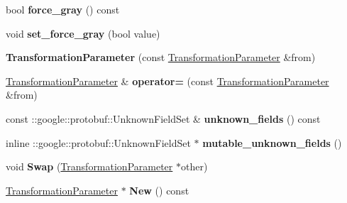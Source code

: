 \begin{DoxyCompactItemize}
bool {\bfseries force\+\_\+gray} () const
\item 
\mbox{\label{classcaffe_1_1_transformation_parameter_a0240305cce1719468726b07a75e9d7bf}} 
void {\bfseries set\+\_\+force\+\_\+gray} (bool value)
\item 
\mbox{\label{classcaffe_1_1_transformation_parameter_a5f3bf7e21a0b138909e8f79fe14c9079}} 
{\bfseries Transformation\+Parameter} (const \mbox{\hyperlink{classcaffe_1_1_transformation_parameter}{Transformation\+Parameter}} \&from)
\item 
\mbox{\label{classcaffe_1_1_transformation_parameter_a898cd4bab74b0477991a00400746e32a}} 
\mbox{\hyperlink{classcaffe_1_1_transformation_parameter}{Transformation\+Parameter}} \& {\bfseries operator=} (const \mbox{\hyperlink{classcaffe_1_1_transformation_parameter}{Transformation\+Parameter}} \&from)
\item 
\mbox{\label{classcaffe_1_1_transformation_parameter_a0df649b76fbb6b25dacf89625b18af6d}} 
const \+::google\+::protobuf\+::\+Unknown\+Field\+Set \& {\bfseries unknown\+\_\+fields} () const
\item 
\mbox{\label{classcaffe_1_1_transformation_parameter_a34152f0da6ea78505db2d8727bcf1677}} 
inline \+::google\+::protobuf\+::\+Unknown\+Field\+Set $\ast$ {\bfseries mutable\+\_\+unknown\+\_\+fields} ()
\item 
\mbox{\label{classcaffe_1_1_transformation_parameter_a45d63004ea061b326e8d1576f086ec4e}} 
void {\bfseries Swap} (\mbox{\hyperlink{classcaffe_1_1_transformation_parameter}{Transformation\+Parameter}} $\ast$other)
\item 
\mbox{\label{classcaffe_1_1_transformation_parameter_ae54727cbc6b19892b17dd4837a6449f0}} 
\mbox{\hyperlink{classcaffe_1_1_transformation_parameter}{Transformation\+Parameter}} $\ast$ {\bfseries New} () const
\item 
\mbox{\label{classcaffe_1_1_transformation_parameter_a08762adeec58cde49c9a0ebcecd0802c}} 

\end{DoxyCompactItemize}
